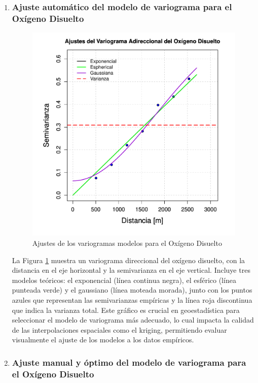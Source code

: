 \begin{enumerate}
\item \subsubsection{Ajuste automático del modelo de variograma para el Oxígeno Disuelto}
\begin{figure}[!htb]
    \centering
    \includegraphics[width=0.8\linewidth]{Figuras_AED//VARIO_OD/OD_VarioAllModelEstimation.pdf}
    \caption{Ajustes de los variogramas modelos para el Oxígeno Disuelto }
    \label{fig:enter-labelnh}
\end{figure}

La Figura \ref{fig:enter-labelnh} muestra un variograma direccional del oxígeno disuelto, con la distancia en el eje horizontal y la semivarianza en el eje vertical. Incluye tres modelos teóricos: el exponencial (línea continua negra), el esférico (línea punteada verde) y el gaussiano (línea moteada morada), junto con los puntos azules que representan las semivarianzas empíricas y la línea roja discontinua que indica la varianza total. Este gráfico es crucial en geoestadística para seleccionar el modelo de variograma más adecuado, lo cual impacta la calidad de las interpolaciones espaciales como el kriging, permitiendo evaluar visualmente el ajuste de los modelos a los datos empíricos.



 \item \subsubsection{Ajuste manual y óptimo del modelo de variograma para el Oxígeno Disuelto}
 

\end{enumerate}
